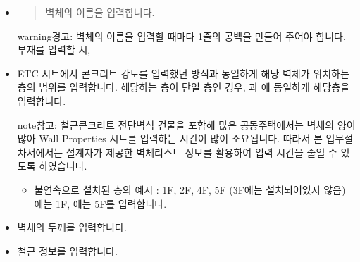 \documentclass[a4paper,11pt,korean,openany,oneside]{sphinxmanual}
\begin{document}
\begin{itemize}
\item {} \begin{description}
\begin{quote}

\sphinxAtStartPar
벽체의 이름을 입력합니다.
\end{quote}

\begin{sphinxadmonition}{warning}{경고:}
\sphinxAtStartPar
벽체의 이름을 입력할 때마다 1줄의 공백을 만들어 주어야 합니다.  부재를 입력할 시,
\end{sphinxadmonition}

\end{description}

\item {} \begin{description}
\sphinxAtStartPar
ETC 시트에서 콘크리트 강도를 입력했던 방식과 동일하게 해당 벽체가 위치하는 층의 범위를 입력합니다.
해당하는 층이 단일 층인 경우, 과 에 동일하게 해당층을 입력합니다.

\begin{sphinxadmonition}{note}{참고:}
\sphinxAtStartPar
철근콘크리트 전단벽식 건물을 포함해 많은 공동주택에서는 벽체의 양이 많아 Wall Properties 시트를 입력하는 시간이 많이 소요됩니다.
따라서 본 업무절차서에서는 설계자가 제공한 벽체리스트 정보를 활용하여 입력 시간을 줄일 수 있도록 하였습니다.
\begin{itemize}
\item {} 
\sphinxAtStartPar
불연속으로 설치된 층의 예시 : 1F, 2F, 4F, 5F (3F에는 설치되어있지 않음)
에는 1F, 에는 5F를 입력합니다.

\end{itemize}
\end{sphinxadmonition}

\end{description}

\item {} \begin{description}
\sphinxAtStartPar
벽체의 두께를 입력합니다.

\end{description}

\item {} \begin{description}
\sphinxAtStartPar
철근 정보를 입력합니다.


\end{description}
\end{itemize}
\end{document}
